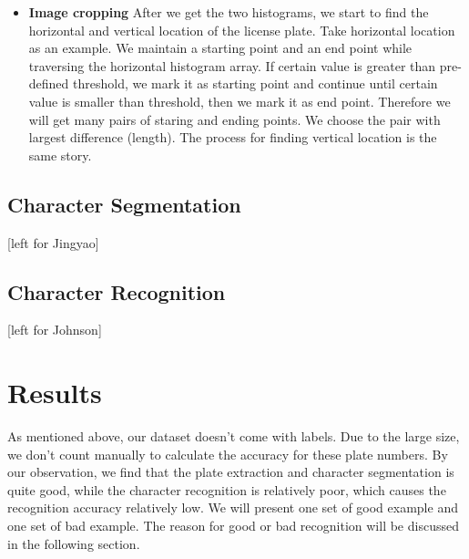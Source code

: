 \documentclass{article}
\begin{document}
\begin{spacing}{1.0}
\begin{itemize}
	\item \textbf{Image cropping} After we get the two histograms, we start to find the horizontal and vertical location of the license plate. Take horizontal location as an example. We maintain a starting point and an end point while traversing the horizontal histogram array. If certain value is greater than pre-defined threshold, we mark it as starting point and continue until certain value is smaller than threshold, then we mark it as end point. Therefore we will get many pairs of staring and ending points. We choose the pair with largest difference (length). The process for finding vertical location is the same story. 
	
\end{itemize}

\subsection{Character Segmentation}
[left for Jingyao]

\subsection{Character Recognition}
[left for Johnson]

\section{Results}
As mentioned above, our dataset doesn't come with labels. Due to the large size, we don't count manually to calculate the accuracy for these plate numbers. By our observation, we find that the plate extraction and character segmentation is quite good, while the character recognition is relatively poor, which causes the recognition accuracy relatively low. We will present one set of good example and one set of bad example. The reason for good or bad recognition will be discussed in the following section.


\end{spacing}
\end{document}
